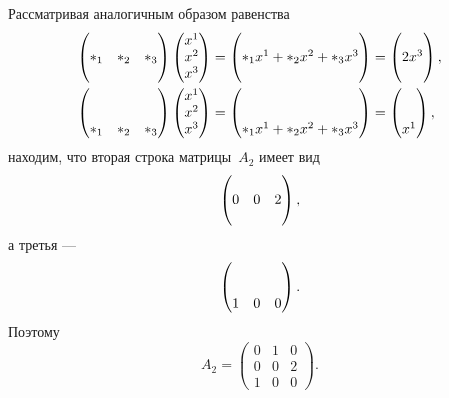\begin{solution}
	Рассматривая аналогичным образом равенства
	\begin{align*}
		\begin{pmatrix}
			\\
			*_1 & *_2 & *_3
			\\
			{}
		\end{pmatrix}
		\begin{pmatrix}
			x^1 \\ x^2 \\ x^3
		\end{pmatrix}
		&=
		\begin{pmatrix}
			\\
			*_1 x^1 + *_2 x^2 + *_3 x^3
			\\
			{}
		\end{pmatrix}
		=
		\begin{pmatrix}
			\\
			2x^3
			\\
			{}
		\end{pmatrix}
		,
		\\
		\begin{pmatrix}
			\\
			\\
			*_1 & *_2 & *_3
		\end{pmatrix}
		\begin{pmatrix}
			x^1 \\ x^2 \\ x^3
		\end{pmatrix}
		&=
		\begin{pmatrix}
			\\
			\\
			*_1 x^1 + *_2 x^2 + *_3 x^3
		\end{pmatrix}
		=
		\begin{pmatrix}
			\\
			\\
			x^1
		\end{pmatrix}
		,
	\end{align*}
	находим, что вторая строка матрицы~$A_2$ имеет вид
	\[
		\begin{pmatrix}
			\\
			0 & 0 & 2
			\\
			{}
		\end{pmatrix},
	\]
	а третья ---
	\[
		\begin{pmatrix}
			\\
			\\
			1 & 0 & 0
		\end{pmatrix}.
	\]
	Поэтому
	\[
		A_2 =
		\begin{pmatrix}
			0 & 1 & 0
			\\
			0 & 0 & 2
			\\
			1 & 0 & 0
		\end{pmatrix}
		.
	\]


\end{solution}
